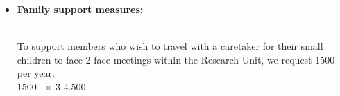 \documentclass[10pt,fleqn,twoside]{article}
\begin{document}
\begin{itemize}
\begin{Emphasize}
{\bf International conference:} An international conference on TDs.
\end{Emphasize}\\
We intend to wrap up the RU with an international small size conference
on the topic (roughly 60 participants). We apply for 30,000~\EUR{} for this.
\vspace{0.2em}\\
30.000~\EUR{} $\times$ 1              \hfill 30.000~\EUR{}\\
\item 
\begin{Emphasize}
{\bf Family support measures:}
\end{Emphasize}\\
To support members who wish to travel with a caretaker for their small children to
face-2-face meetings within the Research Unit, we request 1500~\EUR{} per year.
\vspace{0.2em}\\
1500~\EUR{} $\times$ 3              \hfill 4.500~\EUR{}\\
\end{itemize}
\end{document}
